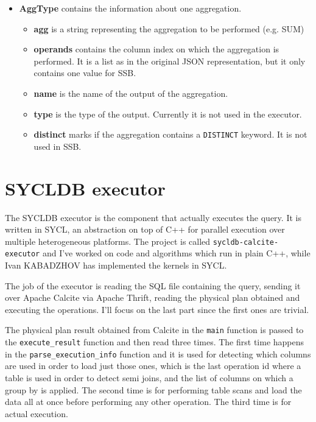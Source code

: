 \documentclass[a4paper, 10pt]{article}
\begin{document}
\begin{itemize}
\begin{itemize}
          \end{itemize}
    \item \textbf{AggType} contains the information about one aggregation.
          \begin{itemize}
              \item \textbf{agg} is a string representing the aggregation to be performed (e.g. SUM)
              \item \textbf{operands} contains the column index on which the aggregation is performed. It is a list as in the original JSON representation, but it only contains one value for SSB.
              \item \textbf{name} is the name of the output of the aggregation.
              \item \textbf{type} is the type of the output. Currently it is not used in the executor.
              \item \textbf{distinct} marks if the aggregation contains a \texttt{DISTINCT} keyword. It is not used in SSB.
          \end{itemize}
\end{itemize}

\section{SYCLDB executor}

The SYCLDB executor is the component that actually executes the query. It is written in SYCL, an abstraction on top of C++ for parallel execution over multiple heterogeneous platforms. The project is called \texttt{sycldb-calcite-executor} and I've worked on code and algorithms which run in plain C++, while Ivan KABADZHOV has implemented the kernels in SYCL.

The job of the executor is reading the SQL file containing the query, sending it over Apache Calcite via Apache Thrift, reading the physical plan obtained and executing the operations. I'll focus on the last part since the first ones are trivial.

The physical plan result obtained from Calcite in the \texttt{main} function is passed to the \texttt{execute\_result} function and then read three times. The first time happens in the \texttt{parse\_execution\_info} function and it is used for detecting which columns are used in order to load just those ones, which is the last operation id where a table is used in order to detect semi joins, and the list of columns on which a group by is applied. The second time is for performing table scans and load the data all at once before performing any other operation. The third time is for actual execution.
\end{document}
